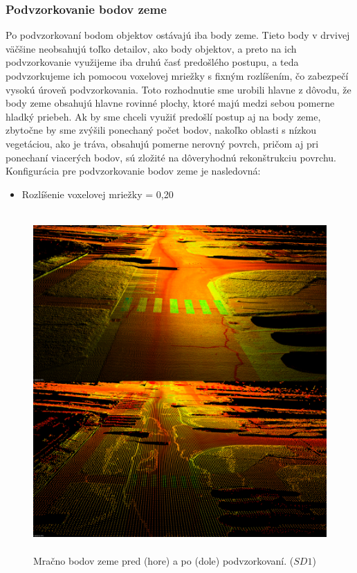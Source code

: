 \subsubsection{Podvzorkovanie bodov zeme}
\noindent Po podvzorkovaní bodom objektov ostávajú iba body zeme. Tieto body v drvivej väčšine neobsahujú toľko detailov, ako body objektov, a preto na ich podvzorkovanie využijeme iba druhú časť predošlého postupu, a teda podvzorkujeme ich pomocou voxelovej mriežky s fixným rozlíšením, čo zabezpečí vysokú úroveň podvzorkovania.
\newline\indent Toto rozhodnutie sme urobili hlavne z dôvodu, že body zeme obsahujú hlavne rovinné plochy, ktoré majú medzi sebou pomerne hladký priebeh. Ak by sme chceli využiť predošlí postup aj na body zeme, zbytočne by sme zvýšili ponechaný počet bodov, nakoľko oblasti s nízkou vegetáciou, ako je tráva, obsahujú pomerne nerovný povrch, pričom aj pri ponechaní viacerých bodov, sú zložité na dôveryhodnú rekonštrukciu povrchu. 
\newline\indent Konfigurácia pre podvzorkovanie bodov zeme je nasledovná:

\begin{itemize}
  \setlength\itemsep{0.2em}
  \item Rozlíšenie voxelovej mriežky = 0,20
\end{itemize}

\begin{figure}[!htbp]
  \centering
  \includegraphics[width=15cm, height=13cm]{img/downsample_ground.png}
  \caption{Mračno bodov zeme pred (hore) a po (dole) podvzorkovaní. ($SD1$)} 
  \label{fig:downsample_ground}
\end{figure} 

